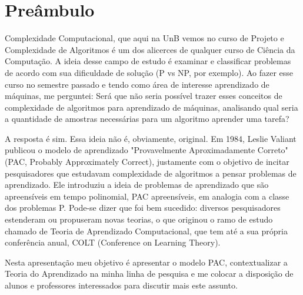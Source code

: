 \documentclass[
10pt, %
a4paper, %
onecolumn, %
]{article}
\begin{document}
\pagestyle{myheadings} %
\markright{\papertitle} %


\thispagestyle{plain} %

\printtitle %


\section*{Preâmbulo} 

    Complexidade Computacional, que aqui na UnB vemos no curso de Projeto e Complexidade de Algoritmos é um dos alicerces de qualquer curso de Ciência da Computação. A ideia desse campo de estudo é examinar e classificar problemas de acordo com sua dificuldade de solução (P vs NP, por exemplo). Ao fazer esse curso no semestre passado e tendo como área de interesse aprendizado de máquinas, me perguntei: Será que não seria possível trazer esses conceitos de complexidade de algoritmos para aprendizado de máquinas, analisando qual seria a quantidade de amostras necessárias para um algoritmo aprender uma tarefa?

    A resposta é sim. Essa ideia não é, obviamente, original. Em 1984, Leslie Valiant publicou o modelo de aprendizado "Provavelmente Aproximadamente Correto" (PAC, Probably Approximately Correct), justamente com o objetivo de incitar pesquisadores que estudavam complexidade de algoritmos a pensar problemas de aprendizado.  Ele introduziu a ideia de problemas de aprendizado que são apreensíveis em tempo polinomial, PAC apreensíveis, em analogia com a classe dos problemas P. Pode-se dizer que foi bem sucedido:  diversos pesquisadores estenderam ou propuseram novas teorias, o que originou o ramo de estudo chamado de Teoria de Aprendizado Computacional, que tem até a sua própria conferência anual, COLT (Conference on Learning Theory).
    
    Nesta apresentação meu objetivo é apresentar o modelo PAC, contextualizar a Teoria do Aprendizado na minha linha de pesquisa e me colocar a disposição de alunos e professores interessados para discutir mais este assunto.
\end{document}
